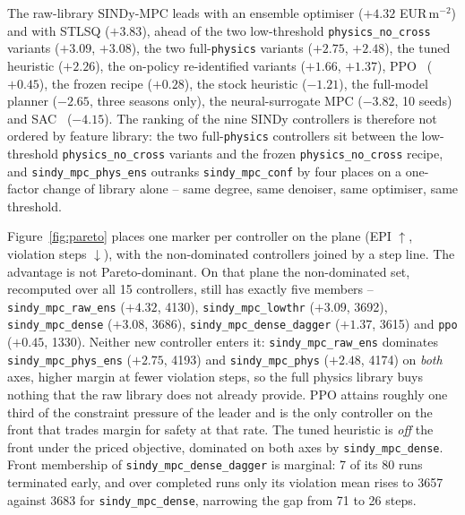 The raw-library SINDy-MPC leads with an ensemble optimiser ($+4.32$ EUR\,m$^{-2}$) and with
STLSQ ($+3.83$), ahead of the two low-threshold \texttt{physics\_no\_cross} variants
($+3.09$, $+3.08$), the two full-\texttt{physics} variants ($+2.75$, $+2.48$), the tuned
heuristic ($+2.26$), the on-policy re-identified variants ($+1.66$, $+1.37$),
PPO~\cite{schulman2017} ($+0.45$), the frozen recipe ($+0.28$), the stock heuristic
($-1.21$), the full-model planner ($-2.65$, three seasons only), the neural-surrogate MPC
($-3.82$, 10 seeds) and SAC~\cite{haarnoja2018} ($-4.15$). The ranking of the nine SINDy
controllers is therefore not ordered by feature library: the two full-\texttt{physics}
controllers sit between the low-threshold \texttt{physics\_no\_cross} variants and the
frozen \texttt{physics\_no\_cross} recipe, and \texttt{sindy\_mpc\_phys\_ens} outranks
\texttt{sindy\_mpc\_conf} by four places on a one-factor change of library alone -- same
degree, same denoiser, same optimiser, same threshold.

Figure~\ref{fig:pareto} places one marker per controller on the plane
(EPI $\uparrow$, violation steps $\downarrow$), with the non-dominated controllers joined
by a step line. The advantage is not Pareto-dominant. On that plane the non-dominated set,
recomputed over all 15 controllers, still has
exactly five members -- \texttt{sindy\_mpc\_raw\_ens} ($+4.32$, 4130),
\texttt{sindy\_mpc\_lowthr} ($+3.09$, 3692), \texttt{sindy\_mpc\_dense} ($+3.08$, 3686),
\texttt{sindy\_mpc\_dense\_dagger} ($+1.37$, 3615) and \texttt{ppo} ($+0.45$, 1330).
Neither new controller enters it: \texttt{sindy\_mpc\_raw\_ens} dominates
\texttt{sindy\_mpc\_phys\_ens} ($+2.75$, 4193) and \texttt{sindy\_mpc\_phys} ($+2.48$,
4174) on \emph{both} axes, higher margin at fewer violation steps, so the full physics
library buys nothing that the raw library does not already provide. PPO attains roughly
one third of the constraint pressure of the leader and is the only controller on the front
that trades margin for safety at that rate. The tuned heuristic is \emph{off} the front
under the priced objective, dominated on both axes by \texttt{sindy\_mpc\_dense}. Front
membership of \texttt{sindy\_mpc\_dense\_dagger} is marginal: 7 of its 80 runs terminated
early, and over completed runs only its violation mean rises to 3657 against 3683 for
\texttt{sindy\_mpc\_dense}, narrowing the gap from 71 to 26 steps.

